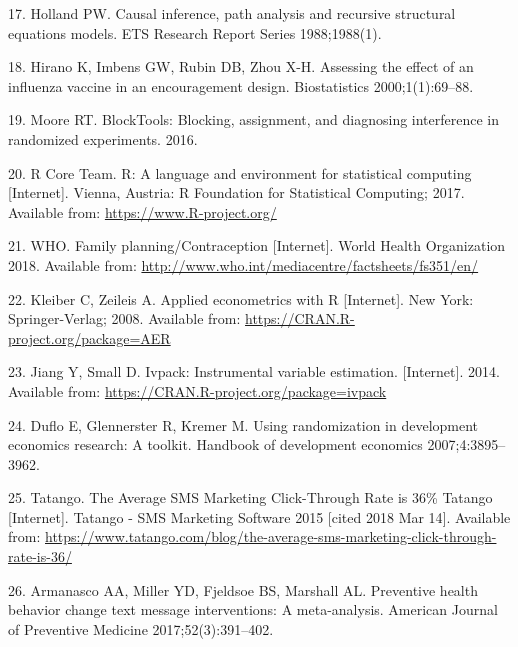 \documentclass[man]{apa6}
\theoremstyle{definition}
\theoremstyle{definition}
\theoremstyle{definition}
\theoremstyle{remark}
\begin{document}
\leavevmode\hypertarget{ref-holland:1988}{}%
17. Holland PW. Causal inference, path analysis and recursive structural
equations models. ETS Research Report Series 1988;1988(1).

\leavevmode\hypertarget{ref-hirano:2000}{}%
18. Hirano K, Imbens GW, Rubin DB, Zhou X-H. Assessing the effect of an
influenza vaccine in an encouragement design. Biostatistics
2000;1(1):69--88.

\leavevmode\hypertarget{ref-blocktools}{}%
19. Moore RT. BlockTools: Blocking, assignment, and diagnosing
interference in randomized experiments. 2016.

\leavevmode\hypertarget{ref-rcore}{}%
20. R Core Team. R: A language and environment for statistical computing
{[}Internet{]}. Vienna, Austria: R Foundation for Statistical Computing;
2017. Available from: \url{https://www.R-project.org/}

\leavevmode\hypertarget{ref-who:2018}{}%
21. WHO. Family planning/Contraception {[}Internet{]}. World Health
Organization 2018. Available from:
\url{http://www.who.int/mediacentre/factsheets/fs351/en/}

\leavevmode\hypertarget{ref-aer}{}%
22. Kleiber C, Zeileis A. Applied econometrics with R {[}Internet{]}.
New York: Springer-Verlag; 2008. Available from:
\url{https://CRAN.R-project.org/package=AER}

\leavevmode\hypertarget{ref-ivpack}{}%
23. Jiang Y, Small D. Ivpack: Instrumental variable estimation.
{[}Internet{]}. 2014. Available from:
\url{https://CRAN.R-project.org/package=ivpack}

\leavevmode\hypertarget{ref-duflo:2007a}{}%
24. Duflo E, Glennerster R, Kremer M. Using randomization in development
economics research: A toolkit. Handbook of development economics
2007;4:3895--3962.

\leavevmode\hypertarget{ref-tatango:2015}{}%
25. Tatango. The Average SMS Marketing Click-Through Rate is 36\%
\textbar{} Tatango {[}Internet{]}. Tatango - SMS Marketing Software 2015
{[}cited 2018 Mar 14{]}. Available from:
\url{https://www.tatango.com/blog/the-average-sms-marketing-click-through-rate-is-36/}

\leavevmode\hypertarget{ref-armanasco:2017}{}%
26. Armanasco AA, Miller YD, Fjeldsoe BS, Marshall AL. Preventive health
behavior change text message interventions: A meta-analysis. American
Journal of Preventive Medicine 2017;52(3):391--402.
\end{document}
